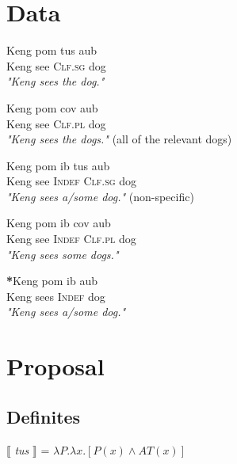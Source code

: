 \documentclass[a4paper,11pt]{article}
\begin{document}
\section{Data}

\begin{exe}
\ex \gll Keng pom tus aub \\
	Keng see \textsc{Clf.sg} dog \\
\glt \textit{"Keng sees the dog."}
\end{exe}

\begin{exe}
\ex \gll Keng pom cov aub \\
	Keng see \textsc{Clf.pl} dog \\
\glt \textit{"Keng sees the dogs."} (all of the relevant dogs)
\end{exe}

\begin{exe}
\ex \gll Keng pom ib tus aub \\
	Keng see \textsc{Indef} \textsc{Clf.sg} dog \\
\glt \textit{"Keng sees a/some dog."} (non-specific)
\end{exe}

\begin{exe}
\ex \gll Keng pom ib cov aub \\
	Keng see \textsc{Indef} \textsc{Clf.pl} dog \\
\glt \textit{"Keng sees some dogs."}
\end{exe}

\begin{exe}
\ex \gll \textbf{*}Keng pom ib aub \\
	Keng sees \textsc{Indef} dog \\
\glt \textit{"Keng sees a/some dog."}
\end{exe}




\section{Proposal}

\subsection{Definites}


\begin{exe}
\ex $\llbracket$ \textit{tus} $\rrbracket$ = $\lambda P.\lambda x.[P(x) \land AT(x)]$
\end{exe}
\end{document}
